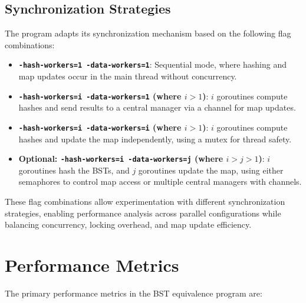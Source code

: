 \documentclass[letterpaper,12pt]{article}
\theoremstyle{remark}
\begin{document}
\subsection{Synchronization Strategies}

The program adapts its synchronization mechanism based on the following flag combinations:

\begin{itemize}
    \item \textbf{\texttt{-hash-workers=1 -data-workers=1}}: Sequential mode, where hashing and map updates occur in the main thread without concurrency.

    \item \textbf{\texttt{-hash-workers=i -data-workers=1} (where \( i > 1 \))}: \( i \) goroutines compute hashes and send results to a central manager via a channel for map updates.

    \item \textbf{\texttt{-hash-workers=i -data-workers=i} (where \( i > 1 \))}: \( i \) goroutines compute hashes and update the map independently, using a mutex for thread safety.

    \item \textbf{Optional: \texttt{-hash-workers=i -data-workers=j} (where \( i > j > 1 \))}: \( i \) goroutines hash the BSTs, and \( j \) goroutines update the map, using either semaphores to control map access or multiple central managers with channels.
\end{itemize}



These flag combinations allow experimentation with different synchronization strategies, enabling performance analysis across parallel configurations while balancing concurrency, locking overhead, and map update efficiency.



\section{Performance Metrics}
The primary performance metrics in the BST equivalence program are:
\end{document}
